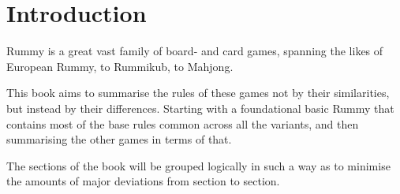 \chapter*{Introduction}
Rummy is a great vast family of board- and card games, spanning the likes of European Rummy, to Rummikub, to Mahjong.

This book aims to summarise the rules of these games not by their similarities, but instead by their differences. Starting with a foundational basic Rummy that contains most of the base rules common across all the variants, and then summarising the other games in terms of that.

The sections of the book will be grouped logically in such a way as to minimise the amounts of major deviations from section to section.